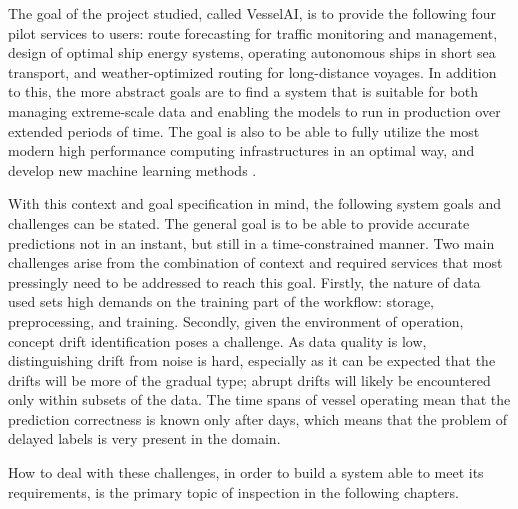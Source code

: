 The goal of the project studied, called VesselAI, is to provide the following four pilot services to users: route forecasting for traffic monitoring and management, design of optimal ship energy systems, operating autonomous ships in short sea transport, and weather-optimized routing for long-distance voyages. In addition to this, the more abstract goals are to find a system that is suitable for both managing extreme-scale data and enabling the models to run in production over extended periods of time. The goal is also to be able to fully utilize the most modern high performance computing infrastructures in an optimal way, and develop new machine learning methods \cite{D1.1}.

With this context and goal specification in mind, the following system goals and challenges can be stated. The general goal is to be able to provide accurate predictions not in an instant, but still in a time-constrained manner. Two main challenges arise from the combination of context and required services that most pressingly need to be addressed to reach this goal. Firstly, the nature of data used sets high demands on the training part of the workflow: storage, preprocessing, and training. Secondly, given the environment of operation, concept drift identification poses a challenge. As data quality is low, distinguishing drift from noise is hard, especially as it can be expected that the drifts will be more of the gradual type; abrupt drifts will likely be encountered only within subsets of the data. The time spans of vessel operating mean that the prediction correctness is known only after days, which means that the problem of delayed labels is very present in the domain.

How to deal with these challenges, in order to build a system able to meet its requirements, is the primary topic of inspection in the following chapters.





